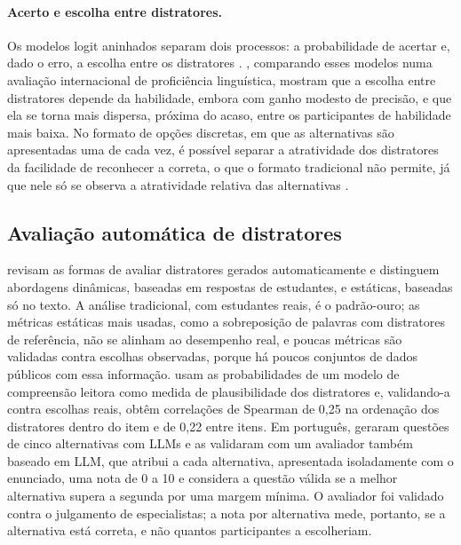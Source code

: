 \paragraph{Acerto e escolha entre distratores.} Os modelos logit aninhados separam dois processos: a probabilidade de acertar e, dado o erro, a escolha entre os distratores \citep{bolt2012}. \citet{haberman2019}, comparando esses modelos numa avaliação internacional de proficiência linguística, mostram que a escolha entre distratores depende da habilidade, embora com ganho modesto de precisão, e que ela se torna mais dispersa, próxima do acaso, entre os participantes de habilidade mais baixa. No formato de opções discretas, em que as alternativas são apresentadas uma de cada vez, é possível separar a atratividade dos distratores da facilidade de reconhecer a correta, o que o formato tradicional não permite, já que nele só se observa a atratividade relativa das alternativas \citep{bolt2019}.

\subsection{Avaliação automática de distratores}\label{sec:ref-avaliacao}

\citet{benedetto2025} revisam as formas de avaliar distratores gerados automaticamente e distinguem abordagens dinâmicas, baseadas em respostas de estudantes, e estáticas, baseadas só no texto. A análise tradicional, com estudantes reais, é o padrão-ouro; as métricas estáticas mais usadas, como a sobreposição de palavras com distratores de referência, não se alinham ao desempenho real, e poucas métricas são validadas contra escolhas observadas, porque há poucos conjuntos de dados públicos com essa informação. \citet{raina2023} usam as probabilidades de um modelo de compreensão leitora como medida de plausibilidade dos distratores e, validando-a contra escolhas reais, obtêm correlações de Spearman de 0,25 na ordenação dos distratores dentro do item e de 0,22 entre itens. Em português, \citet{mucciaccia2025} geraram questões de cinco alternativas com LLMs e as validaram com um avaliador também baseado em LLM, que atribui a cada alternativa, apresentada isoladamente com o enunciado, uma nota de 0 a 10 e considera a questão válida se a melhor alternativa supera a segunda por uma margem mínima. O avaliador foi validado contra o julgamento de especialistas; a nota por alternativa mede, portanto, se a alternativa está correta, e não quantos participantes a escolheriam.

